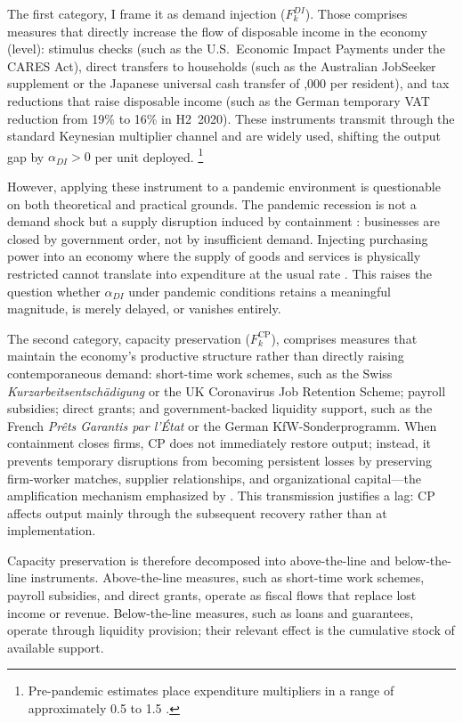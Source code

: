 \documentclass[12pt, a4paper]{article}
\begin{document}
The first category, I frame it as demand injection ($F^{DI}_k$). Those comprises measures that directly increase the flow of disposable income in the economy (level): stimulus checks (such as the U.S.\ Economic Impact Payments under the CARES Act), direct transfers to households (such as the Australian JobSeeker supplement or the Japanese universal cash transfer of ,000 per resident), and tax reductions that raise disposable income (such as the German temporary VAT reduction from 19\% to 16\% in H2~2020). These instruments transmit through the standard Keynesian multiplier channel and are widely used, shifting the output gap by $\alpha_{DI} > 0$ per unit deployed. \footnote{Pre-pandemic estimates place expenditure multipliers in a range of approximately 0.5 to 1.5 \citep{ramey2018, blanchard2002}.}

However, applying these instrument to a pandemic environment is questionable on both theoretical and practical grounds. The pandemic  recession is not a demand shock but a supply disruption induced by containment \citep{guerrieri2022}: businesses are closed by government order, not by insufficient demand. Injecting purchasing power into an economy where the supply of goods and services is physically restricted cannot translate into expenditure at the usual rate \citep{chetty2020, coibion2020}. This raises the question whether $\alpha_{DI}$ under pandemic conditions retains a meaningful magnitude, is merely delayed, or vanishes entirely.

The second category, capacity preservation ($F^{\text{CP}}_k$), comprises measures that maintain the economy's productive structure rather than directly raising contemporaneous demand: short-time work schemes, such as the Swiss \textit{Kurzarbeitsentsch\"{a}digung} or the UK Coronavirus Job Retention Scheme; payroll subsidies; direct grants; and government-backed liquidity support, such as the French \textit{Pr\^{e}ts Garantis par l'\'{E}tat} or the German KfW-Sonderprogramm. When containment closes firms, CP does not immediately restore output; instead, it prevents temporary disruptions from becoming persistent losses by preserving firm-worker matches, supplier relationships, and organizational capital---the amplification mechanism emphasized by \citet{guerrieri2022}. This transmission justifies a lag: CP affects output mainly through the subsequent recovery rather than at implementation.

Capacity preservation is therefore decomposed into above-the-line and below-the-line instruments. Above-the-line measures, such as short-time work schemes, payroll subsidies, and direct grants, operate as fiscal flows that replace lost income or revenue. Below-the-line measures, such as loans and guarantees, operate through liquidity provision; their relevant effect is the cumulative stock of available support.
\end{document}
